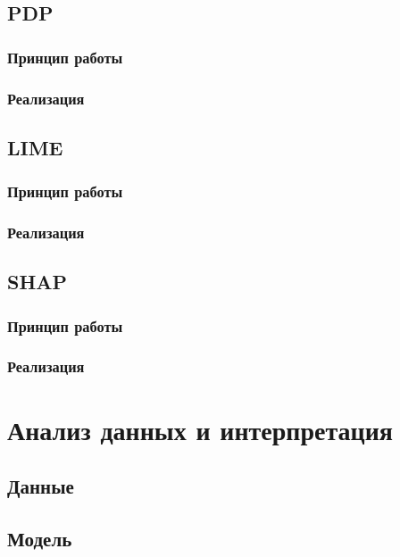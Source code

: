 \documentclass[a4paper, 12pt]{article}
\begin{document}
	\subsection{PDP}
	
	\subsubsection{Принцип работы}
	
	\subsubsection{Реализация}
	
	\subsection{LIME}
	
	\subsubsection{Принцип работы}
	
	\subsubsection{Реализация}
	
	\subsection{SHAP}
	
	\subsubsection{Принцип работы}
	
	\subsubsection{Реализация}
	
	\newpage

	\section{Анализ данных и интерпретация}
	
	\subsection{Данные}
	
	\subsection{Модель}
	
	\newpage
\end{document}
